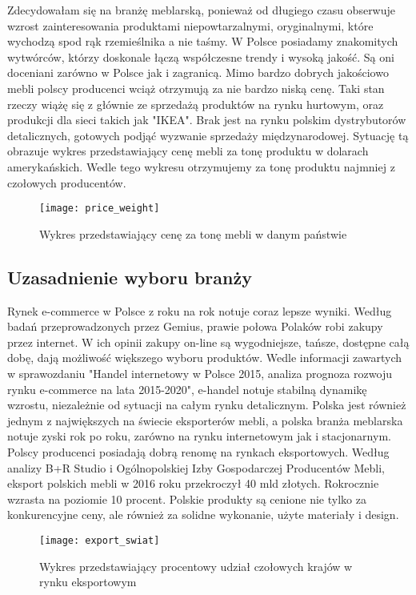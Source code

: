			\par Zdecydowałam się na branżę meblarską, ponieważ od długiego czasu obserwuje wzrost zainteresowania produktami niepowtarzalnymi, oryginalnymi, które wychodzą spod rąk rzemieślnika a nie taśmy. W Polsce posiadamy znakomitych wytwórców, którzy doskonale łączą współczesne trendy i wysoką jakość. Są oni doceniani zarówno w Polsce jak i zagranicą. Mimo bardzo dobrych jakościowo mebli polscy producenci wciąż otrzymują za nie bardzo niską cenę. Taki stan rzeczy wiążę się z głównie ze sprzedażą produktów na rynku hurtowym, oraz produkcji dla sieci takich jak "IKEA". Brak jest na rynku polskim dystrybutorów detalicznych, gotowych podjąć wyzwanie sprzedaży międzynarodowej. Sytuację tą obrazuje wykres przedstawiający cenę mebli za tonę produktu w dolarach amerykańskich. Wedle tego wykresu otrzymujemy za tonę produktu najmniej z czołowych producentów.
			
			\begin{figure}[H]
				\centering
				\texttt{[image: price\_weight]}
				\caption{Wykres przedstawiający cenę za tonę mebli w danym państwie}
			\end{figure}
		
		\subsection{Uzasadnienie wyboru branży}
			\par Rynek e-commerce w Polsce z roku na rok notuje coraz lepsze wyniki. Według badań przeprowadzonych przez Gemius, prawie połowa Polaków robi zakupy przez internet. W ich opinii zakupy on-line są wygodniejsze, tańsze, dostępne całą dobę, dają możliwość większego wyboru produktów. Wedle informacji zawartych w sprawozdaniu "Handel internetowy w Polsce 2015, analiza prognoza rozwoju rynku e-commerce  na lata 2015-2020", e-handel notuje stabilną dynamikę wzrostu, niezależnie od sytuacji na całym rynku detalicznym.
			Polska jest również jednym z największych na świecie eksporterów mebli, a polska branża meblarska notuje zyski rok po roku, zarówno na rynku internetowym jak i stacjonarnym. Polscy producenci posiadają dobrą renomę  na rynkach eksportowych. Według analizy B+R Studio i Ogólnopolskiej Izby Gospodarczej Producentów Mebli, eksport polskich mebli w 2016 roku przekroczył 40 mld złotych. Rokrocznie wzrasta na poziomie 10 procent. Polskie produkty są cenione nie tylko za konkurencyjne ceny, ale również za solidne wykonanie, użyte materiały i design. 
		
			\begin{figure}[H]
				\centering
				\texttt{[image: export\_swiat]}
				\caption{Wykres przedstawiający procentowy udział czołowych krajów w rynku eksportowym}
			\end{figure}
	
